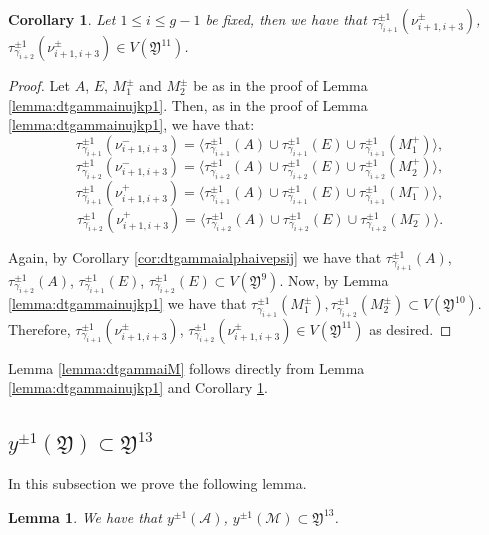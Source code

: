 \documentclass{artv3}
\newtheorem{lemma}[theorem]{Lemma}
\newtheorem{corollary}[theorem]{Corollary}
\newcommand*{\dt}[1]{\tau_{#1}}
\newcommand{\A}{\mathcal{A}}
\newcommand{\M}{\mathcal{M}}
\newcommand*{\Y}{\mathfrak{Y}}
\begin{document}
\begin{corollary}\label{cor:dtgammainujkp2}
 Let $1 \leq i \leq g-1$ be fixed, then we have that $\dt{\gamma_{i+1}}^{\pm 1}(\nu^{\pm}_{i+1,i+3})$, $\dt{\gamma_{i+2}}^{\pm 1}(\nu^{\pm}_{i+1,i+3}) \in V(\Y^{11})$.
\end{corollary}
\begin{proof}
 Let $A$, $E$, $M^{\pm}_{1}$ and $M^{\pm}_{2}$ be as in the proof of Lemma \ref{lemma:dtgammainujkp1}. Then, as in the proof of Lemma \ref{lemma:dtgammainujkp1}, we have that: 
 $$\dt{\gamma_{i+1}}^{\pm 1}(\nu^{-}_{i+1,i+3}) = \langle \dt{\gamma_{i+1}}^{\pm 1}(A) \cup \dt{\gamma_{i+1}}^{\pm 1}(E) \cup \dt{\gamma_{i+1}}^{\pm 1}(M^{+}_{1}) \rangle,$$
 $$\dt{\gamma_{i+2}}^{\pm 1}(\nu^{-}_{i+1,i+3}) = \langle \dt{\gamma_{i+2}}^{\pm 1}(A) \cup \dt{\gamma_{i+2}}^{\pm 1}(E) \cup \dt{\gamma_{i+2}}^{\pm 1}(M^{+}_{2})\rangle,$$
 $$\dt{\gamma_{i+1}}^{\pm 1}(\nu^{+}_{i+1,i+3}) = \langle \dt{\gamma_{i+1}}^{\pm 1}(A) \cup \dt{\gamma_{i+1}}^{\pm 1}(E) \cup \dt{\gamma_{i+1}}^{\pm 1}(M^{-}_{1}) \rangle,$$
 $$\dt{\gamma_{i+2}}^{\pm 1}(\nu^{+}_{i+1,i+3}) = \langle \dt{\gamma_{i+2}}^{\pm 1}(A) \cup \dt{\gamma_{i+2}}^{\pm 1}(E) \cup \dt{\gamma_{i+2}}^{\pm 1}(M^{-}_{2})\rangle.$$
 
 Again, by Corollary \ref{cor:dtgammaialphaivepsij} we have that $\dt{\gamma_{i+1}}^{\pm 1}(A)$, $\dt{\gamma_{i+2}}^{\pm 1}(A)$, $\dt{\gamma_{i+1}}^{\pm 1}(E)$, $\dt{\gamma_{i+2}}^{\pm 1}(E) \subset V(\Y^{9})$. Now, by Lemma \ref{lemma:dtgammainujkp1} we have that $\dt{\gamma_{i+1}}^{\pm 1}(M^{\pm}_{1}), \dt{\gamma_{i+2}}^{\pm 1}(M^{\pm}_{2}) \subset V(\Y^{10})$. Therefore, $\dt{\gamma_{i+1}}^{\pm 1}(\nu^{\pm}_{i+1,i+3})$, $\dt{\gamma_{i+2}}^{\pm 1}(\nu^{\pm}_{i+1,i+3}) \in V(\Y^{11})$ as desired.
\end{proof}

Lemma \ref{lemma:dtgammaiM} follows directly from Lemma \ref{lemma:dtgammainujkp1} and Corollary \ref{cor:dtgammainujkp2}.



\subsection{$y^{\pm 1}(\Y)\subset \Y^{13}$}\label{subsec:y(Y)}

In this subsection we prove the following lemma.
\begin{lemma}\label{lemma:y(Y)}
We have that $y^{\pm 1}(\A)$, $y^{\pm 1}(\M) \subset \Y^{13}$.
\end{lemma}
\end{document}
